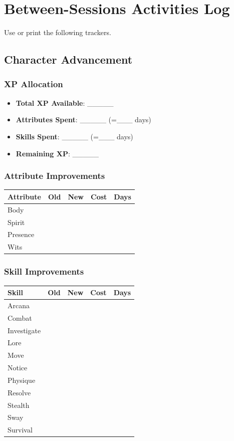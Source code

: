 \section{Between-Sessions Activities Log}

Use or print the following trackers.

\subsection{Character Advancement}
\subsubsection*{XP Allocation}
\begin{itemize}
  \item \textbf{Total XP Available}: \_\_\_\_\_
  \item \textbf{Attributes Spent}: \_\_\_\_\_ (=\_\_\_ days)
  \item \textbf{Skills Spent}: \_\_\_\_\_ (=\_\_\_ days)
  \item \textbf{Remaining XP}: \_\_\_\_\_
\end{itemize}

\subsubsection*{Attribute Improvements}
\begin{tabular}{|l|c|c|c|c|}
\hline
\textbf{Attribute} & \textbf{Old} & \textbf{New} & \textbf{Cost} & \textbf{Days} \\
\hline
Body & & & & \\
Spirit & & & & \\
Presence & & & & \\
Wits & & & & \\
\hline
\end{tabular}

\subsubsection*{Skill Improvements}
\begin{tabular}{|l|c|c|c|c|}
\hline
\textbf{Skill} & \textbf{Old} & \textbf{New} & \textbf{Cost} & \textbf{Days} \\
\hline
Arcana & & & & \\
Combat & & & & \\
Investigate & & & & \\
Lore & & & & \\
Move & & & & \\
Notice & & & & \\
Physique & & & & \\
Resolve & & & & \\
Stealth & & & & \\
Sway & & & & \\
Survival & & & & \\
\hline
\end{tabular}


